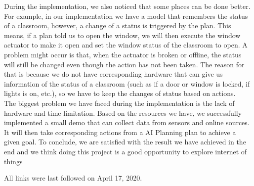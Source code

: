 \documentclass[runningheads]{llncs}
\begin{document}
During the implementation, we also noticed that some places can be done better. For example, in our implementation we have a model that remembers the status of a classroom, however, a change of a status is triggered by the plan. This means, if a plan told us to open the window, we will then execute the window actuator to make it open and set the window status of the classroom to open. A problem might occur is that, when the actuator is broken or offline, the status will still be changed even though the action has not been taken. The reason for that is because we do not have corresponding hardware that can give us information of the status of a classroom (such as if a door or window is locked, if lights is on, etc.), so we have to keep the changes of status based on actions.\\

The biggest problem we have faced during the implementation is the lack of hardware and time limitation. Based on the resources we have, we successfully implemented a small demo that can collect data from sensors and online sources. It will then take corresponding actions from a AI Planning plan to achieve a given goal. To conclude, we are satisfied with the result we have achieved in the end and we think doing this project is a good opportunity to explore internet of things


%
%



All links were last followed on April 17, 2020.
\end{document}
